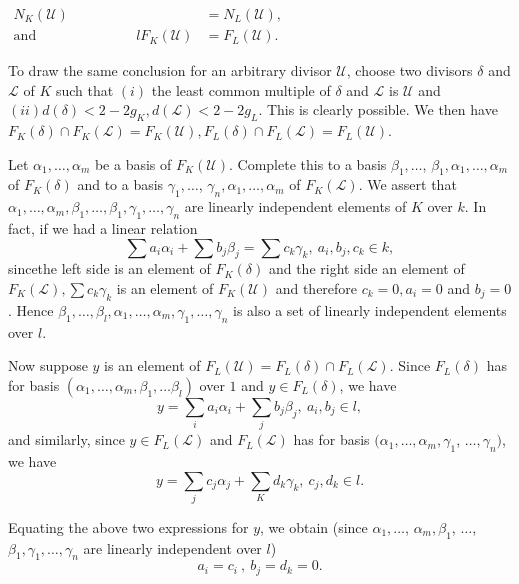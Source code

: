 \medskip
\noindent
$\begin{aligned}
  N_K (\mathscr{U}) & = N_L(\mathscr{U}),\\
  \text{and} \hspace{3cm}  lF_K(\mathscr{U}) & = F_L (\mathscr{U}).
\end{aligned}$
\medskip

To draw the same conclusion for an arbitrary divisor $\mathscr{U}$,
choose two divisors $\delta$ and $\mathcal{L}$ of $K$ such that $(i)$
the least common multiple of $\delta$ and $\mathcal{L}$ is
$\mathscr{U}$ and $(ii) d (\delta) < 2-2g_K, d(\mathcal{L}) <
2-2g_L$. This is clearly possible. We then have $F_K(\delta) \cap
F_K(\mathcal{L}) = F_K(\mathscr{U}), F_L(\delta) \cap F_L(\mathcal{L})
= F_L (\mathscr{U})$. 

Let $\alpha_1, \ldots , \alpha_m$ be a basis of
$F_K(\mathscr{U})$. Complete this to a basis $\beta_1, \ldots$,
$\beta_1, \alpha_1, \ldots, \alpha_m$ of $F_K(\delta)$ and to a basis
$\gamma_1, \ldots$, $\gamma_n, \alpha_1, \ldots, \alpha_m$ of
$F_K(\mathcal{L})$. We assert that $\alpha_1, \ldots, \alpha_m,
\beta_1, \ldots , \beta_1, \gamma_1, \ldots , \gamma_n$ are linearly
independent elements of $K$ over $k$. In fact, if we had a linear
relation 
$$
\sum a_i \alpha_i + \sum b_j \beta_j = \sum c_k \gamma_k, ~a_i, b_j, c_k \in k,
$$
since\pageoriginale the left side is an element of $F_K(\delta)$ and the right side
an element of $F_K(\mathcal{L}), \sum c_k \gamma_k$ is an element of
$F_K(\mathscr{U})$ and therefore $c_k=0, a_i = 0$ and $b_j = 0$. Hence
$\beta_1, \ldots, \beta_l, \alpha_1, \ldots, \alpha_m, \gamma_1,
\ldots, \gamma_n$ is also a set of linearly independent elements over
$l$. 

Now suppose $y$ is an element of $F_L(\mathscr{U}) = F_L (\delta) \cap
F_L (\mathcal{L})$. Since $F_L(\delta )$ has for basis $(\alpha_1,
\ldots, \alpha_m, \beta_1, \ldots \beta_l)$ over $1$ and $y \in
F_L(\delta)$, we have 
$$
y = \sum_i a_i \alpha_i + \sum_j b_j \beta_j, ~a_i , b_j \in l,
$$
and similarly, since $y \in F_L(\mathcal{L})$ and $F_L(\mathcal{L})$
has for basis $(\alpha_1, \ldots , \alpha_m, \gamma_1$, $\ldots,
\gamma_n)$, we have 
$$
y= \sum_j c_j \alpha_j + \sum_K d_k \gamma_k, ~c_j, d_k \in l.
$$

Equating the above two expressions for $y$, we obtain (since
$\alpha_1, \ldots$, $\alpha_m , \beta_1$, $\ldots$, $\beta_1 , \gamma_1,
\ldots, \gamma_n$ are linearly independent over $l$) 
$$
a_i = c_i~, ~b_j = d_k = 0.
$$

